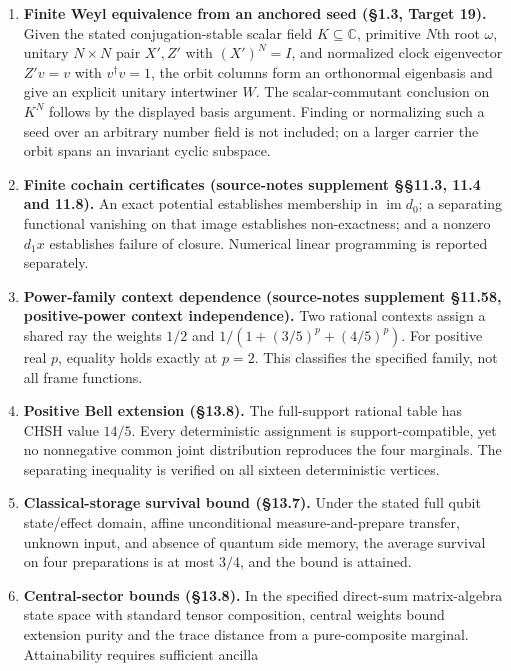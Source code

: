 \documentclass[
  11pt,
]{article}
\providecommand{\tightlist}{%
  \setlength{\itemsep}{0pt}\setlength{\parskip}{0pt}}
\begin{document}
\begin{enumerate}
\def\labelenumi{\arabic{enumi}.}
\tightlist
\item
  \textbf{Finite Weyl equivalence from an anchored seed (§1.3, Target
  19).} Given the stated conjugation-stable scalar field
  \(K \subseteq \mathbb C\), primitive \(N\)th root \(\omega\), unitary
  \(N \times N\) pair \(X', Z'\) with \((X')^N = I\), and normalized
  clock eigenvector \(Z'v = v\) with \(v^\dagger v = 1\), the orbit
  columns form an orthonormal eigenbasis and give an explicit unitary
  intertwiner \(W\). The scalar-commutant conclusion on \(K^N\) follows
  by the displayed basis argument. Finding or normalizing such a seed
  over an arbitrary number field is not included; on a larger carrier
  the orbit spans an invariant cyclic subspace.
\item
  \textbf{Finite cochain certificates (source-notes supplement §§11.3,
  11.4 and 11.8).} An exact potential establishes membership in
  \(\operatorname{im}d_0\); a separating functional vanishing on that
  image establishes non-exactness; and a nonzero \(d_1x\) establishes
  failure of closure. Numerical linear programming is reported
  separately.
\item
  \textbf{Power-family context dependence (source-notes supplement
  §11.58, positive-power context independence).} Two rational contexts
  assign a shared ray the weights \(1/2\) and \(1/(1+(3/5)^p+(4/5)^p)\).
  For positive real \(p\), equality holds exactly at \(p=2\). This
  classifies the specified family, not all frame functions.
\item
  \textbf{Positive Bell extension (§13.8).} The full-support rational
  table has CHSH value \(14/5\). Every deterministic assignment is
  support-compatible, yet no nonnegative common joint distribution
  reproduces the four marginals. The separating inequality is verified
  on all sixteen deterministic vertices.
\item
  \textbf{Classical-storage survival bound (§13.7).} Under the stated
  full qubit state\allowbreak{}/\allowbreak{}effect domain, affine
  unconditional measure-and-prepare transfer, unknown input, and absence
  of quantum side memory, the average survival on four preparations is
  at most \(3/4\), and the bound is attained.
\item
  \textbf{Central-sector bounds (§13.8).} In the specified direct-sum
  matrix-algebra state space with standard tensor composition, central
  weights bound extension purity and the trace distance from a
  pure-composite marginal. Attainability requires sufficient ancilla

\end{enumerate}
\end{document}
